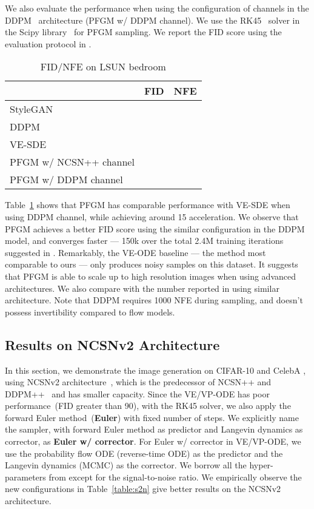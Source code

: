 We also evaluate the performance when using the configuration of channels in the DDPM~\cite{Ho2020DenoisingDP} architecture (PFGM w/ DDPM channel). We use the RK45~\citep{Dormand1980AFO} solver in the Scipy library~\citep{Virtanen2020SciPy1F} for PFGM sampling. We report the FID score using the evaluation protocol in \cite{dhariwal2021diffusion}.
\begin{table}[htbp]
\begin{center}
\caption{FID/NFE on LSUN bedroom }\label{tab:lsun}
\begin{tabular}{l c c}
\toprule
      &FID  & NFE \\
    \midrule
    StyleGAN~\cite{karras2019style} &  &  \\
    DDPM~\cite{Ho2020DenoisingDP} & & \\
    VE-SDE~\cite{Song2021ScoreBasedGM} &   &  \\
    \midrule
    PFGM w/ NCSN++ channel &    &  \\
    PFGM w/ DDPM channel&    &  \\
     \bottomrule
\end{tabular}
\end{center}
\end{table}

Table~\ref{tab:lsun} shows that PFGM has comparable performance with VE-SDE when using DDPM channel, while achieving around 15 acceleration. We observe that PFGM achieves a better FID score using the similar configuration in the DDPM model, and converges faster — 150k over the total 2.4M training iterations suggested in \cite{Song2021ScoreBasedGM}. Remarkably, the VE-ODE baseline — the method most comparable to ours — only produces noisy samples on this dataset. It suggests that PFGM is able to scale up to high resolution images when using advanced architectures. 
We also compare with the number reported in \cite{Ho2020DenoisingDP} using similar architecture. Note that DDPM requires 1000 NFE during sampling, and doesn’t possess invertibility compared to flow models. 



\subsection{Results on NCSNv2 Architecture}

In this section, we demonstrate the image generation on CIFAR-10 and CelebA , using NCSNv2 architecture~\cite{Song2020ImprovedTF}, which is the predecessor of NCSN++ and DDPM++~\cite{Song2021ScoreBasedGM} and has smaller capacity. Since the VE/VP-ODE has poor performance~(FID greater than 90), with the RK45 solver, we also apply the forward Euler method~(\textbf{Euler}) with fixed number of steps. We explicitly name the sampler, with forward Euler method as predictor and Langevin dynamics as corrector, as \textbf{Euler w/ corrector}. For Euler w/ corrector in VE/VP-ODE, we use the probability flow ODE (reverse-time ODE) as the predictor and the Langevin dynamics (MCMC) as the corrector. We borrow all the hyper-parameters from \cite{Song2021ScoreBasedGM} except for the signal-to-noise ratio. We empirically observe the new configurations in Table~\ref{table:s2n} give better results on the NCSNv2 architecture.

